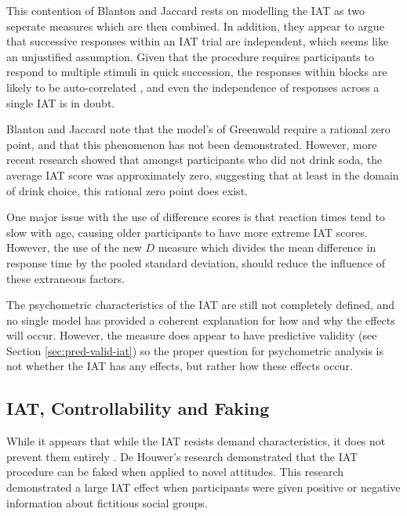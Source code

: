  This contention of Blanton and Jaccard rests on modelling the IAT as two seperate measures which are then combined. In addition, they appear to argue that successive responses within an IAT trial are independent, which seems like an unjustified assumption. Given that the procedure requires participants to respond to multiple stimuli in quick succession, the responses within blocks are likely to be auto-correlated \cite{mccleary1980applied ,craigmile2010hierarchical}, and even the independence of responses across a single IAT is in doubt.

Blanton and Jaccard note that the model's of Greenwald require a rational zero point, and that this phenomenon has not been demonstrated. However, more recent research \cite{Karpinski2005} showed that amongst participants who did not drink soda, the average IAT score was approximately zero, suggesting that at least in the domain of drink choice, this rational zero point does exist. 

One major issue with the use of difference scores is that reaction times tend to slow with age, causing older participants to have more extreme IAT scores. However, the use of the new $D$ measure \cite{Greenwald2003} which divides the mean difference in response time by the pooled standard deviation, should reduce the influence of these extraneous factors. 

The psychometric characteristics of the IAT are still not completely defined, and no single model has provided a coherent explanation for how and why the effects will occur. However, the measure does appear to have predictive validity (see Section \ref{sec:pred-valid-iat}) so the proper question for psychometric analysis is not whether the IAT has any effects, but rather how these effects occur. 




\subsection{IAT, Controllability and Faking}
\label{sec:iat-contr-faking}

While it appears that while the IAT resists demand characteristics, it does not prevent them entirely \cite{DeHouwer2007b}. De Houwer's research demonstrated that the IAT procedure can be faked when applied to novel attitudes. This research  demonstrated a large IAT effect when participants were given positive or negative information about fictitious social groups. 

